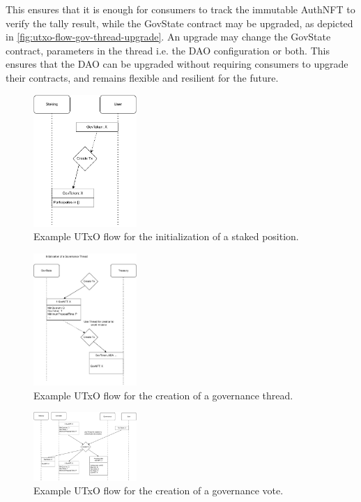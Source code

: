 \documentclass[11pt]{article}
\begin{document}
This ensures that it is enough for consumers to track the immutable AuthNFT to verify the tally result,
while the GovState contract may be upgraded, as depicted in \cref{fig:utxo-flow-gov-thread-upgrade}.
An upgrade may change the GovState contract, parameters in the thread i.e. the DAO configuration or both.
This ensures that the DAO can be upgraded without requiring consumers to upgrade their contracts,
and remains flexible and resilient for the future.

\begin{figure}
    \centering
    \includegraphics[width=0.35\textwidth]{figures/gov-init-stake.pdf}
    \caption{Example UTxO flow for the initialization of a staked position.}
    \label{fig:utxo-flow-gov-stake-init}
\end{figure}

\begin{figure}
    \centering
    \includegraphics[width=0.35\textwidth]{figures/init-gov-thread.pdf}
    \caption{Example UTxO flow for the creation of a governance thread.}
    \label{fig:utxo-flow-gov-thread-init}
\end{figure}

\begin{figure}
    \centering
    \includegraphics[width=0.35\textwidth]{figures/init-vote.pdf}
    \caption{Example UTxO flow for the creation of a governance vote.}
    \label{fig:utxo-flow-vote-init}
\end{figure}
\end{document}
